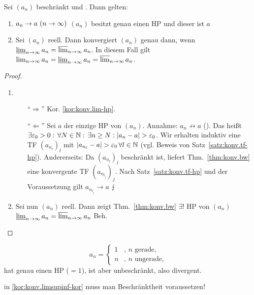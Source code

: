 \documentclass[12pt]{scrreprt}
\begin{document}
\begin{kor}
  \label{kor:konv.limsupinf-kor}
  Sei $(a_n)$ beschränkt und . Dann gelten:
  \begin{enumerate}
  \item \label{kor:konv.limsupinf-kor.a} $a_n\to a\ (n\rightarrow\infty)$ \gdw
    $(a_n)$ besitzt genau einen HP und dieser ist $a$
  \item \label{kor:konv.limsupinf-kor.b} Sei $(a_n)$ reell. Dann
    konvergiert $(a_n)$ genau dann, wenn
    $\varliminf_{n\rightarrow\infty}{a_n}=\varlimsup_{n\rightarrow\infty}{a_n}$. In diesem Fall gilt
    $\lim_{n\rightarrow\infty}{a_n}=\varliminf_{n\rightarrow\infty}{a_n}=\varlimsup_{n\rightarrow\infty}{a_n}$.
  \end{enumerate}
\end{kor}
\begin{proof}
  \begin{enumerate}
  \item
    \begin{enumerate}
    \item["`$\Rightarrow$"'] Kor. \ref{kor:konv.lim-hp}.
    \item["`$\Leftarrow$"'] Sei $a$ der einzige HP von
      $(a_n)$. Annahme: $a_n\not\to a$ (\ninf). Das heißt $\exists
      \varepsilon_0>0:\,\forall N\in\mathbb{N}:\,\exists n\ge N:
      \left\lvert a_n-a\right\lvert>\varepsilon_0$. Wir erhalten induktiv eine TF $(a_{n_l})_l$
      mit $\left\lvert a_{n_l}-a\right\lvert>\varepsilon_0\,\forall l\in\mathbb{N}$ (vgl. Beweis von
      Satz~\ref{satz:konv.tf-hp}). Andererseits: Da $(a_{n_l})_l$
      beschränkt ist, liefert Thm.~\ref{thm:konv.bw} eine konvergente
      TF $(a_{n_{l_j}})_j$. Nach Satz~\ref{satz:konv.tf-hp} und der
      Voraussetzung gilt $a_{n_{l_j}}\to a$ $\lightning$
    \end{enumerate}
  \item Sei nun $(a_n)$ reell. Dann zeigt Thm.~\ref{thm:konv.bw}
    $\exists!$ HP von $(a_n)$ \gdw $\varliminf_{n\rightarrow\infty}{a_n}=\varlimsup_{n\rightarrow\infty}{a_n}$
     Beh.
  \end{enumerate}
\end{proof}

\begin{bem*}
  \[ a_n = 
  \begin{cases}
    1&\text{, } n \text{ gerade,} \\
    n&\text{, } n \text{ ungerade,}
  \end{cases}
  \] hat genau einen HP ($=1$), ist aber unbeschränkt, also
  divergent.
  
  \folgt in \ref{kor:konv.limsupinf-kor} muss man Beschränktheit voraussetzen!
\end{bem*}
\end{document}
